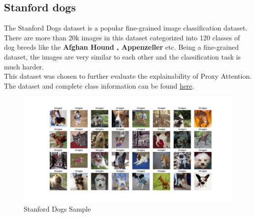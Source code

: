 \subsection{Stanford dogs}
The Stanford Dogs dataset \cite{khoslaNovelDatasetFineGrained} is a popular fine-grained image classification dataset. There are more than 20k images in this dataset categorized into  120 classes of dog breeds like the \textbf{Afghan Hound , Appenzeller} etc. Being a fine-grained dataset, the images are very similar to each other and the classification task is much harder.\\
This dataset was chosen to further evaluate the explainability of Proxy Attention.\\
The dataset and complete class information can be found \href{http://vision.stanford.edu/aditya86/ImageNetDogs/}{here}.
\begin{figure}[H]
    \centering
    \includegraphics[width=1\textwidth]{images/dogs.pdf}
    \caption{Stanford Dogs Sample}
    \label{fig:dogs}
\end{figure}






